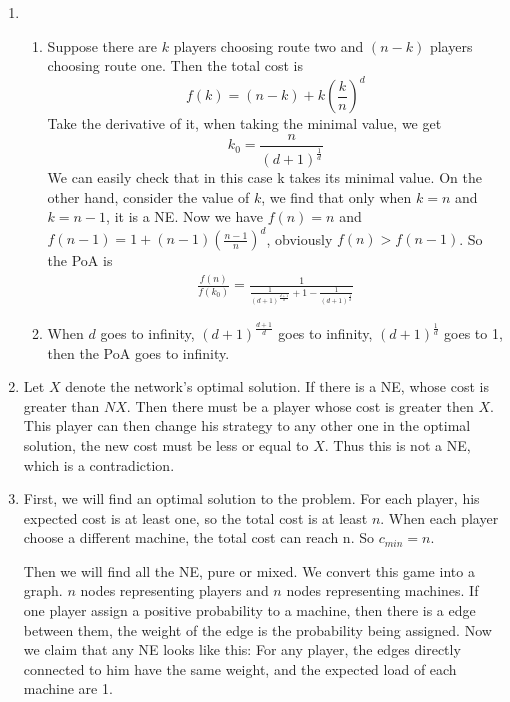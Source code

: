 \documentclass[12pt]{cgtmd}
\begin{document}

\begin{enumerate}
    \item 
        \begin{enumerate}
            \item Suppose there are $k$ players choosing route two and $(n - k)$ players choosing route one. Then the total cost is
                $$f(k) = (n - k) + k(\frac{k}{n})^d$$
                Take the derivative of it, when taking the minimal value, we get 
                $$k_0 = \frac{n}{(d + 1)^{\frac{1}{d}}}$$
                We can easily check that in this case k takes its minimal value.
                On the other hand, consider the value of $k$, we find that only when $k = n$ and $k = n - 1$, it is a NE.
                Now we have $f(n) = n$ and $f(n - 1) = 1 + (n - 1)(\frac{n - 1}{n})^d$, obviously $f(n) > f(n - 1)$.
                So the PoA is 
                \begin{align}
                    \frac{f(n)}{f(k_0)} = \frac{1}{\frac{1}{(d + 1)^{\frac{d + 1}{d}}} + 1 - \frac{1}{(d + 1)^{\frac{1}{d}}}}
                \end{align}
            \item When $d$ goes to infinity, $(d + 1)^{\frac{d + 1}{d}}$ goes to infinity, $(d + 1)^{\frac{1}{d}}$ goes to 1, then the PoA goes to infinity. 
        \end{enumerate}
    \item Let $X$ denote the network's optimal solution. If there is a NE, whose cost is greater than $NX$. Then there must be a player whose cost is greater then $X$. This player can then change his strategy to any other one in the optimal solution, the new cost must be less or equal to $X$. Thus this is not a NE, which is a contradiction.
    \item First, we will find an optimal solution to the problem. For each player, his expected cost is at least one, so the total cost is at least $n$. When each player choose a different machine, the total cost can reach n. So $c_{min} = n$.

        Then we will find all the NE, pure or mixed. We convert this game into a graph. $n$ nodes representing players and $n$ nodes representing machines. If one player assign a positive probability to a machine, then there is a edge between them, the weight of the edge is the probability being assigned. Now we claim that any NE looks like this: For any player, the edges directly connected to him have the same weight, and the expected load of each machine are 1.


\end{enumerate}
\end{document}
